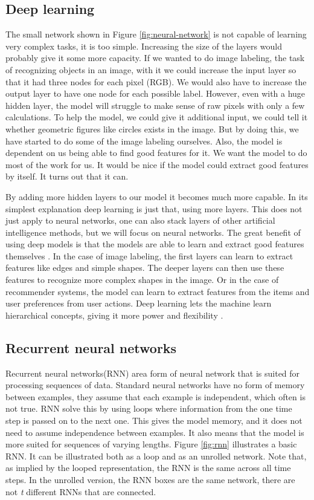 \subsection{Deep learning}
The small network shown in Figure \ref{fig:neural-network} is not capable of learning very complex tasks, it is too simple.  Increasing the size of the layers would probably give it some more capacity. If we wanted to do image labeling, the task of recognizing objects in an image, with it we could increase the input layer so that it had three nodes for each pixel (RGB). We would also have to increase the output layer to have one node for each possible label. However, even with a huge hidden layer, the model will struggle to make sense of raw pixels with only a few calculations. To help the model, we could give it additional input, we could tell it whether geometric figures like circles exists in the image. But by doing this, we have started to do some of the image labeling ourselves. Also, the model is dependent on us being able to find good features for it. We want the model to do most of the work for us. It would be nice if the model could extract good features by itself. It turns out that it can.

By adding more hidden layers to our model it becomes much more capable. In its simplest explanation deep learning is just that, using more layers. This does not just apply to neural networks, one can also stack layers of other artificial intelligence methods, but we will focus on neural networks. The great benefit of using deep models is that the models are able to learn and extract good features themselves \cite{Goodfellow-et-al-2016-Book}. In the case of image labeling, the first layers can learn to extract features like edges and simple shapes. The deeper layers can then use these features to recognize more complex shapes in the image. Or in the case of recommender systems, the model can learn to extract features from the items and user preferences from user actions. Deep learning lets the machine learn hierarchical concepts, giving it more power and flexibility \cite{Goodfellow-et-al-2016-Book}.

\subsection{Recurrent neural networks}
Recurrent neural networks(RNN) area form of neural network that is suited for processing sequences of data. Standard neural networks have no form of memory between examples, they assume that each example is independent, which often is not true. RNN solve this by using loops where information from the one time step is passed on to the next one. This gives the model memory, and it does not need to assume independence between examples. It also means that the model is more suited for sequences of varying lengths. Figure \ref{fig:rnn} illustrates a basic RNN. It can be illustrated both as a loop and as an unrolled network. Note that, as implied by the looped representation, the RNN is the same across all time steps. In the unrolled version, the RNN boxes are the same network, there are not \textit{t} different RNNs that are connected.

